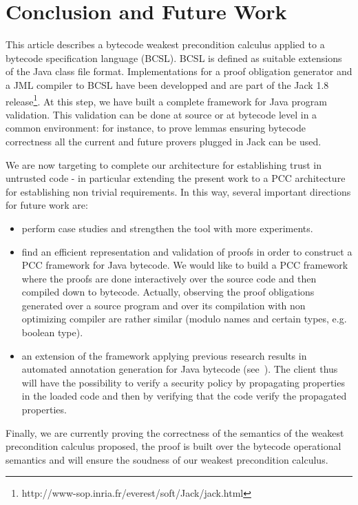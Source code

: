 \section{Conclusion and Future Work}\label{conclusion}
This article describes a bytecode weakest precondition calculus applied to a bytecode specification language (BCSL).
BCSL is defined as suitable extensions of the Java class file format.
Implementations for a proof obligation generator and a JML compiler to BCSL have been developped and are part of the Jack 1.8 release\footnote{http://www-sop.inria.fr/everest/soft/Jack/jack.html}.
At this step, we have built a complete framework for Java program validation. This validation can be done at source or at bytecode level in a common environment: for instance, to prove lemmas ensuring bytecode correctness all the current and future provers plugged in Jack can be used.

We are now targeting to complete our architecture for establishing trust in untrusted code - in particular extending the present work to a PCC architecture for establishing non trivial requirements.  
In this way, several important directions for future work are:
\begin{itemize}
\item perform case studies and strengthen the tool with more experiments.
\item find an efficient representation and validation of proofs in order to construct a PCC framework for Java bytecode. We would like to build a PCC framework where the proofs are done interactively over the source code
and then compiled down to bytecode. Actually, observing the proof obligations generated over a source program and over its compilation with non optimizing compiler are
rather similar (modulo names and certain types, e.g. boolean type).
\item an extension of the framework applying previous research results in automated annotation generation for Java bytecode (see~\cite{PBBHL}). The client thus will have the possibility to verify a security policy by propagating properties in the loaded code and then by verifying that the code verify the propagated properties.

\end{itemize}
Finally, we are currently proving the correctness of the semantics of the weakest precondition calculus proposed, the proof is built over the bytecode operational semantics and will ensure the soudness of our weakest precondition calculus.

